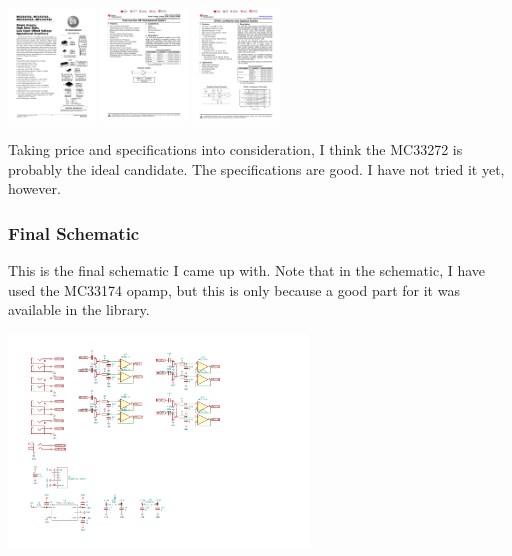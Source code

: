 \documentclass[a4paper]{article}
\begin{document}
\begin{center}
\includegraphics[height=3cm,page=2,trim={11.6cm 19.8cm 5cm 3.2cm},clip]{datasheets/MC33272A-D.PDF}
\includegraphics[height=3cm,page=3,trim={3cm 11.4cm 12.2cm 11.9cm},clip]{datasheets/tl064.pdf}
\includegraphics[height=3cm,page=4,trim={7cm 18cm 7cm 2.8cm},clip]{datasheets/opa1679.pdf}
\end{center}

Taking price and specifications into consideration, I think the MC33272 is probably the ideal candidate. The specifications are good. I have not tried it yet, however.

\subsubsection{Final Schematic}

This is the final schematic I came up with. Note that in the schematic, I have used the MC33174 opamp, but this is only because a good part for it was available in the library. 

\begin{center}
\includegraphics[trim={6.9cm 16cm 16.5cm 1.8cm},width=8cm,clip]{images/audio-mixer.pdf}
\end{center}
\end{document}
